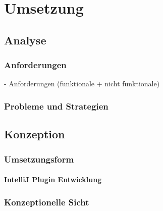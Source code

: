 \chapter{Umsetzung}
\section{Analyse}
\subsection{Anforderungen}
- Anforderungen (funktionale + nicht funktionale)\\

\subsection{Probleme und Strategien}
\section{Konzeption}
\subsection{Umsetzungsform}
\subsubsection{IntelliJ Plugin Entwicklung}

\subsection{Konzeptionelle Sicht}
